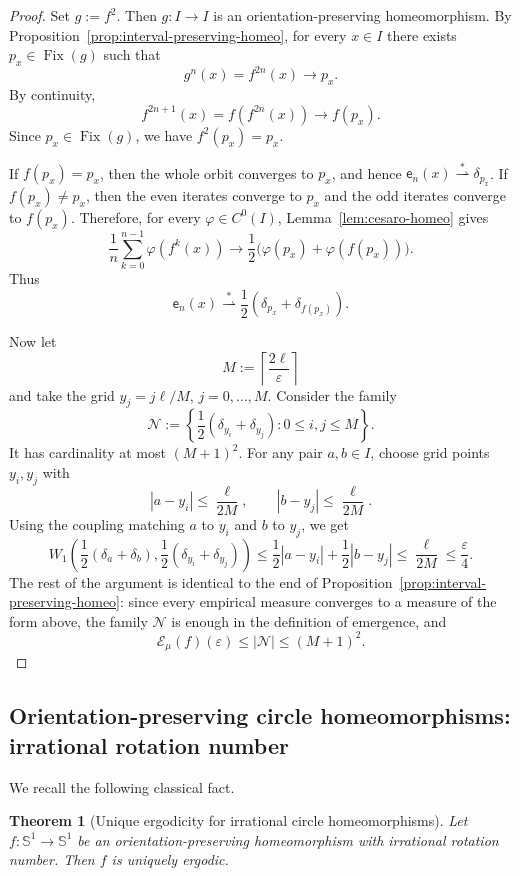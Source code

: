 \documentclass[12pt,a4paper,twoside]{article}
\theoremstyle{plain}
\newtheorem{theorem}{Theorem}[section]
\theoremstyle{definition}
\newcommand{\cE}{{\mathcal E}}
\newcommand{\emp}{\mathsf e}
\newcommand{\wto}{\overset{*}{\rightharpoonup}}
\begin{document}
\begin{proof}
Set \(g:=f^2\). Then \(g:I\to I\) is an orientation-preserving
homeomorphism. By Proposition~\ref{prop:interval-preserving-homeo}, for
every \(x\in I\) there exists \(p_x\in\operatorname{Fix}(g)\) such that
\[
g^n(x)=f^{2n}(x)\longrightarrow p_x.
\]
By continuity,
\[
f^{2n+1}(x)=f(f^{2n}(x))\longrightarrow f(p_x).
\]
Since \(p_x\in\operatorname{Fix}(g)\), we have \(f^2(p_x)=p_x\).

If \(f(p_x)=p_x\), then the whole orbit converges to \(p_x\), and hence
\(\emp_n(x)\wto\delta_{p_x}\). If \(f(p_x)\neq p_x\), then the even iterates
converge to \(p_x\) and the odd iterates converge to \(f(p_x)\). Therefore,
for every \(\varphi\in C^0(I)\), Lemma~\ref{lem:cesaro-homeo} gives
\[
\frac1n\sum_{k=0}^{n-1}\varphi(f^k(x))
\longrightarrow
\frac12\bigl(\varphi(p_x)+\varphi(f(p_x))\bigr).
\]
Thus
\[
\emp_n(x)\wto
\frac12(\delta_{p_x}+\delta_{f(p_x)}).
\]

Now let
\[
M:=\left\lceil\frac{2\ell}{\varepsilon}\right\rceil
\]
and take the grid \(y_j=j\ell/M\), \(j=0,\dots,M\). Consider the family
\[
\mathcal N
:=
\left\{
\frac12(\delta_{y_i}+\delta_{y_j}):0\le i,j\le M
\right\}.
\]
It has cardinality at most \((M+1)^2\). For any pair \(a,b\in I\), choose
grid points \(y_i,y_j\) with
\[
|a-y_i|\le \frac{\ell}{2M},
\qquad
|b-y_j|\le \frac{\ell}{2M}.
\]
Using the coupling matching \(a\) to \(y_i\) and \(b\) to \(y_j\), we get
\[
W_1\left(
\frac12(\delta_a+\delta_b),
\frac12(\delta_{y_i}+\delta_{y_j})
\right)
\le
\frac12|a-y_i|+\frac12|b-y_j|
\le
\frac{\ell}{2M}
\le
\frac{\varepsilon}{4}.
\]
The rest of the argument is identical to the end of
Proposition~\ref{prop:interval-preserving-homeo}: since every empirical
measure converges to a measure of the form above, the family \(\mathcal N\)
is enough in the definition of emergence, and
\[
\cE_\mu(f)(\varepsilon)
\le
|\mathcal N|
\le
(M+1)^2.
\]
\end{proof}

\subsection{Orientation-preserving circle homeomorphisms: irrational rotation number}

We recall the following classical fact.

\begin{theorem}[Unique ergodicity for irrational circle homeomorphisms]
\label{thm:irrational-circle-unique-ergodic}
Let \(f:\mathbb S^1\to\mathbb S^1\) be an orientation-preserving
homeomorphism with irrational rotation number. Then \(f\) is uniquely
ergodic.
\end{theorem}
\end{document}
